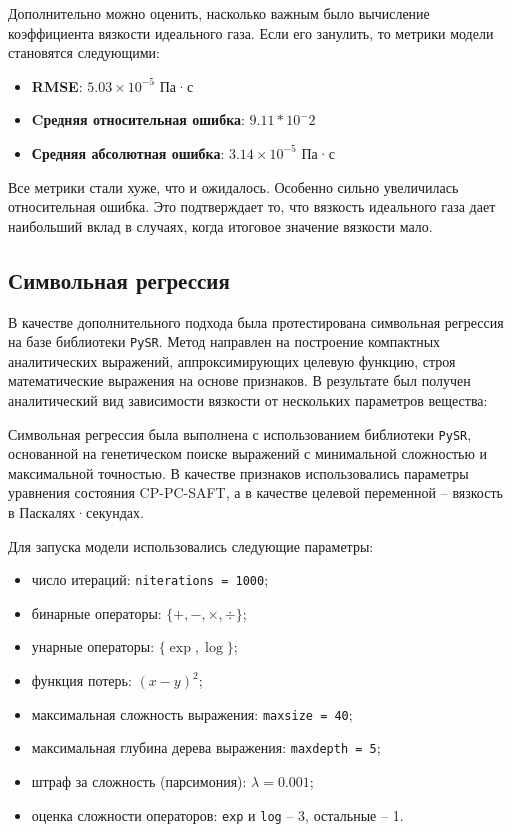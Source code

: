 \documentclass[a4paper,12pt]{article}
\begin{document}
    Дополнительно можно оценить, насколько важным было вычисление коэффициента вязкости идеального газа. Если его занулить, то метрики модели становятся следующими:
    \begin{itemize}
      \item \textbf{RMSE}: \(5.03 \times 10^{-5} \) Па·с
      \item \textbf{Cредняя относительная ошибка}: \(9.11*10^-2\)
      \item \textbf{Средняя абсолютная ошибка}: \(3.14 \times 10^{-5} \) Па·с \end{itemize}

    Все метрики стали хуже, что и ожидалось. Особенно сильно увеличилась относительная ошибка. Это подтверждает то, что вязкость идеального газа дает наибольший вклад в случаях, когда итоговое значение вязкости мало.

  \subsection{Символьная регрессия}

    В качестве дополнительного подхода была протестирована символьная регрессия на базе библиотеки \texttt{PySR}. Метод направлен на построение компактных аналитических выражений, аппроксимирующих целевую функцию, строя математические выражения на основе признаков. В результате был получен аналитический вид зависимости вязкости от нескольких параметров вещества:

    Символьная регрессия была выполнена с использованием библиотеки \texttt{PySR}, основанной на генетическом поиске выражений с минимальной сложностью и максимальной точностью. В качестве признаков использовались параметры уравнения состояния CP-PC-SAFT, а в качестве целевой переменной -- вязкость в Паскалях·секундах.

Для запуска модели использовались следующие параметры:

\begin{itemize}
  \item число итераций: \texttt{niterations = 1000};
  \item бинарные операторы: \( \{+, -, \times, \div \} \);
  \item унарные операторы: \( \{\exp, \log\} \);
  \item функция потерь: \( (x - y)^2 \);
  \item максимальная сложность выражения: \texttt{maxsize = 40};
  \item максимальная глубина дерева выражения: \texttt{maxdepth = 5};
  \item штраф за сложность (парсимония): \( \lambda = 0.001 \);
  \item оценка сложности операторов: \texttt{exp} и \texttt{log} -- 3, остальные -- 1.
\end{itemize}
\end{document}
